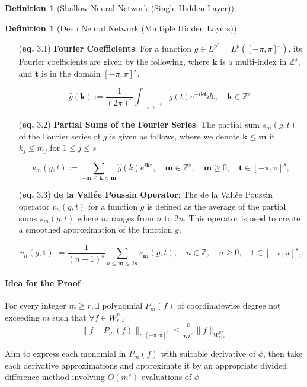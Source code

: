 \documentclass[11pt,a4paper]{article}
\theoremstyle{plain}
\theoremstyle{definition}
\newtheorem{definition}[theorem]{Definition}
\theoremstyle{remark}
\begin{document}
\begin{definition}[Shallow Neural Network (Single Hidden Layer)]
\begin{definition}[Deep Neural Network (Multiple Hidden Layers)]
\begin{enumerate}
    \item[(\textbf{eq.} 3.1)] \textbf{Fourier Coefficients}: For a function \( g \in L^{p^*} = L^{p}([-\pi ,\pi ]^s) \), its Fourier coefficients are given by the following, where \( \mathbf{k} \) is a multi-index in \( \mathbb{Z}^s \), and \( \mathbf{t}  \) is in the domain \( [-\pi, \pi]^s \).

    \[
      \hat{g}(\mathbf{k}) := \frac{1}{(2\pi)^s} \int_{[-\pi,\pi]^s} g(t)e^{-i \mathbf{kt}} d \mathbf{t}, \quad \mathbf{k} \in \mathbb{Z}^s.  
    \]


    \item[(\textbf{eq.} 3.2)]\textbf{Partial Sums of the Fourier Series}: The partial sum \( s_m(g, t) \) of the Fourier series of \( g \) is given as follows, where we denote \(\mathbf{k} \leq \mathbf{m} \) if \(k_{j} \leq m_{j}\) for \( 1 \leq  j \leq s\) 
    
    \[
        s_m(g,t) := \sum_{-\mathbf{m} \leq \mathbf{k} < \mathbf{m}} \hat{g}(k)e^{i \mathbf{kt}}, \quad \mathbf{m}  \in \mathbb{Z}^s, \quad \mathbf{m}  \geq 0, \quad \mathbf{t} \in [-\pi, \pi]^s,
    \]

    \item[(\textbf{eq.} 3.3)]\textbf{de la Vallée Poussin Operator}: The de la Vallée Poussin operator \( v_n(g, t) \) for a function \( g \) is defined as the average of the partial sums \( s_m(g, t) \) where \( m \) ranges from \( n \) to \( 2n \). This operator is used to create a smoothed approximation of the function \( g \).
    
    \[
        v_n(g,\mathbf{t} ) := \frac{1}{(n+1)^s} \sum_{n \leq \mathbf{m} \leq 2n} s_{\mathbf{m}}(g,t), \quad n \in \mathbb{Z}, \quad n \geq 0, \quad \mathbf{t} \in [-\pi, \pi]^s,
    \]


\end{enumerate}

\paragraph{Idea for the Proof}

For every integer \(m \geq r, \exists \) polynomial \(P_{m}(f)\) of coordinatewise degree not exceeding \(m\) such that \(\forall f \in W^{p}_{r,s}\) 
\[
\|f - P_{m}(f)\|_{p,[-\pi,\pi]^s} \leq \frac{c}{m^r} \|f\|_{W^{p*}_{r,s}}  
\]

Aim to express each monomial in \(P_{m}(f)\) with suitable derivative of \(\phi \), then take each derivative approximations and approximate it by an appropriate divided difference method involving \(O(m^s)\) evaluations of \(\phi \) 



\end{definition}
\end{definition}
\end{document}
